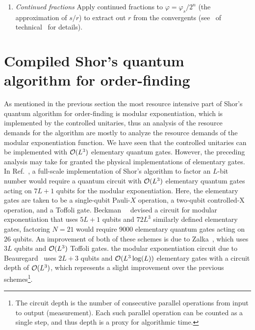 \begin{enumerate}
\item \emph{Continued fractions}\newline
    Apply continued fractions to $\varphi=\varphi_s/2^n$ (the approximation of $s / r$) to extract out $r$ from the convergents (see~ of technical~ for details).

\end{enumerate}


\section{Compiled Shor's quantum algorithm for order-finding}
As mentioned in the previous section the most resource intensive part of Shor's quantum algorithm for order-finding is modular exponentiation, which is implemented by the controlled unitaries, thus an analysis of the resource demands for the algorithm are mostly to analyze the resource demands of the modular exponentiation function. We have seen that the controlled unitaries can be implemented with $\mathcal{O}(L^3)$ elementary quantum gates. However, the preceding analysis may take for granted the physical implementations of elementary gates. In Ref.~\cite{Vedral_1996}, a full-scale implementation of Shor's algorithm to factor an $L$-bit number would require a quantum circuit with $\mathcal{O}(L^3)$ elementary quantum gates acting on $7L + 1$ qubits for the modular exponentiation. Here, the elementary gates are taken to be a single-qubit Pauli-$X$ operation, a two-qubit controlled-X operation, and a Toffoli gate. Beckman~\etal~\cite{Beckman_1996} devised a circuit for modular exponentiation that uses $5L + 1$ qubits and $72L^3$ similarly defined elementary gates, \ie factoring $N=21$ would require $9000$ elementary quantum gates acting on $26$ qubits. An improvement of both of these schemes is due to Zalka~\cite{Zalka_1998}, which uses $3L$ qubits and $\mathcal{O}(L^3)$ Toffoli gates. the modular exponentiation circuit due to Beauregard~\cite{Beauregard_2003} uses $2L + 3$ qubits and $\mathcal{O}(L^3\log(L))$ elementary gates with a circuit depth of $\mathcal{O}(L^3)$, which represents a slight improvement over the previous schemes\footnote{The circuit depth is the number of consecutive parallel operations from input to output (measurement). Each such parallel operation can be counted as a single step, and thus depth is a proxy for algorithmic time.}.


